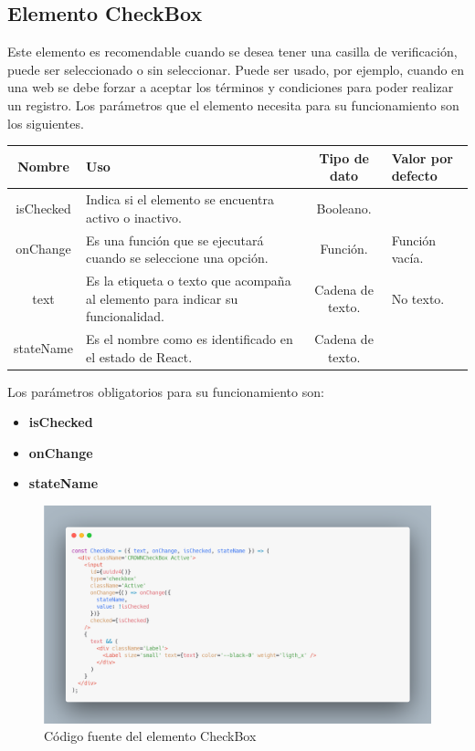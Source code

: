 \subsection{Elemento CheckBox}
Este elemento es recomendable cuando se desea tener una casilla de verificación, puede ser seleccionado o sin seleccionar. Puede ser usado, por ejemplo, cuando en una web se debe forzar a aceptar los términos y condiciones para poder realizar un registro.
Los parámetros que el elemento necesita para su funcionamiento son los siguientes.
\newline
    \newline
    \begin{center}
     \begin{tabular}{ | c |  p{5cm}  | c | p{3cm} |} 
     \hline
     \textbf{Nombre} &  \textbf{Uso} &  \textbf{ Tipo de dato} &  \textbf{Valor por defecto}\\ [0.5ex] 
     \hline\hline
      isChecked & Indica si el elemento se encuentra activo o inactivo.  &  Booleano.  & \\  [2.5ex] 
     \hline
      onChange &  Es una función que se ejecutará cuando se seleccione una opción.  & Función.   &  Función vacía.\\  [2.5ex] 
     \hline
      text &  Es la etiqueta o texto que acompaña al elemento para indicar su funcionalidad. &  Cadena de texto.  & No texto. \\  [2.5ex] 
     \hline
      stateName & Es el nombre como es identificado en el estado de React.  &  Cadena de texto.  &  \\  [2.5ex] 
     \hline
    \end{tabular}
    \end{center}
    \newline
                \newline
Los parámetros obligatorios para su funcionamiento son:
\begin{itemize}
\item \textbf{isChecked} 
\item \textbf{onChange} 
\item \textbf{stateName} 
\end{itemize}
\newline
    \newline
    \begin{figure}[H]
    \centering
    \includegraphics[width=1\textwidth]{./Imagenes/8.34.png}
    \caption[Código fuente del elemento CheckBox]{Código fuente del elemento CheckBox}
    \end{figure}
